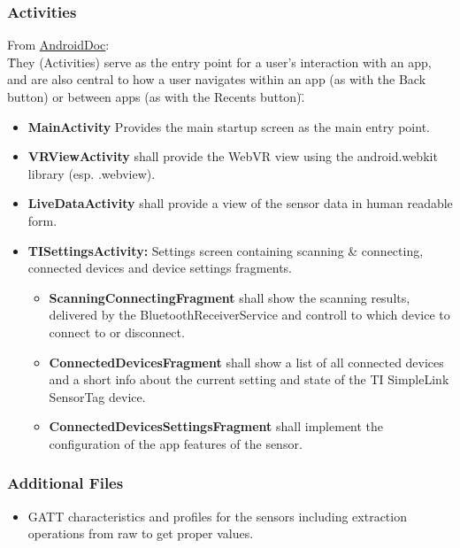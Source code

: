 \subsubsection{Activities}
From \href{https://developer.android.com/guide/components/services.html}{AndroidDoc}: \\
\"They (Activities) serve as the entry point for a user's interaction with an app, and are also central to how a user navigates within an app (as with the Back button) or between apps (as with the Recents button)\". \newline
\begin{itemize}
  \item \textbf{MainActivity} Provides the main startup screen as the main entry point.
  \item \textbf{VRViewActivity} shall provide the WebVR view using the android.webkit library (esp. .webview).
  \item \textbf{LiveDataActivity} shall provide a view of the sensor data in human readable form.
  \item \textbf{TISettingsActivity:} Settings screen containing scanning \& connecting, connected devices and device settings fragments. \\
  \begin{itemize}
    \item \textbf{ScanningConnectingFragment} shall show the scanning results, delivered by the BluetoothReceiverService and controll to which device to connect to or disconnect.
    \item \textbf{ConnectedDevicesFragment} shall show a list of all connected devices and a short info about the current setting and state of the TI SimpleLink SensorTag device.
    \item \textbf{ConnectedDevicesSettingsFragment} shall implement the configuration of the app features of the sensor.
  \end{itemize}
\end{itemize}

\subsubsection{Additional Files}
\begin{itemize}
  \item GATT characteristics and profiles for the sensors including extraction operations from raw to get proper values.
\end{itemize}
